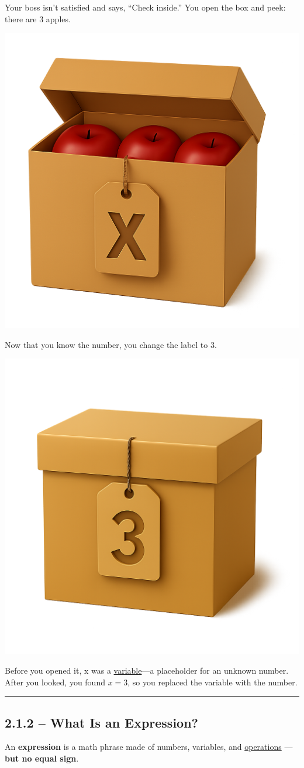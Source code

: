 \documentclass[
  letterpaper,
  DIV=11,
  numbers=noendperiod]{scrreprt}
\begin{document}
Your boss isn't satisfied and says, ``Check inside.'' You open the box
and peek: there are 3 apples.

\begin{center}
\includegraphics[width=0.35\linewidth,height=\textheight,keepaspectratio]{images/Unit_2/Lesson_1/AppleBoxOpen.png}
\end{center}

Now that you know the number, you change the label to 3.

\begin{center}
\includegraphics[width=0.35\linewidth,height=\textheight,keepaspectratio]{images/Unit_2/Lesson_1/AppleBox3.png}
\end{center}

Before you opened it, x was a
\href{./glossary.html\#glossary-variable}{variable}---a placeholder for
an unknown number. After you looked, you found \(x = 3\), so you
replaced the variable with the number.

\begin{center}\rule{0.5\linewidth}{0.5pt}\end{center}

\subsection*{2.1.2 -- What Is an
Expression?}\label{what-is-an-expression}

An \textbf{expression} is a math phrase made of numbers, variables, and
\href{./glossary.html\#glossary-operation}{operations} --- \textbf{but
no equal sign}.
\end{document}
